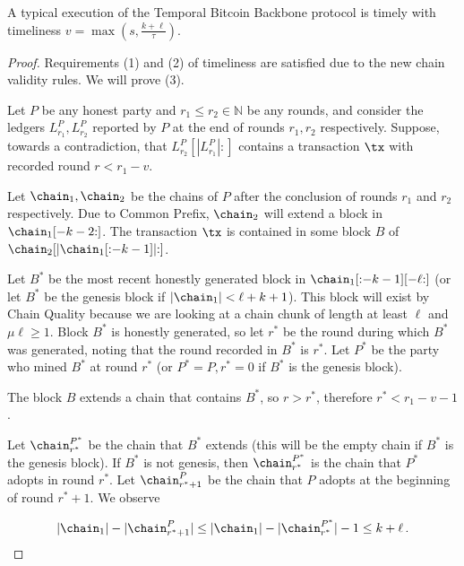 \begin{theorem}
  A typical execution of the Temporal Bitcoin Backbone protocol is timely
  with timeliness $v = \max(s, \frac{k + \ell}{\tau})$.
\end{theorem}
\begin{proof}
  Requirements (1) and (2) of timeliness are satisfied due to the new chain validity rules.
  We will prove (3).

  Let $P$ be any honest party and $r_1 \leq r_2 \in \mathbb{N}$ be any rounds, and consider
  the ledgers $L^P_{r_1}, L^P_{r_2}$ reported by $P$ at the end of rounds $r_1, r_2$ respectively.
  Suppose, towards a contradiction, that $L^P_{r_2}[|L^P_{r_1}|{:}]$ contains a transaction
  $\tx$ with recorded round $r < r_1 - v$.

  Let $\chain_1, \chain_2$ be the chains of $P$ after the conclusion of rounds $r_1$
  and $r_2$ respectively.
  Due to Common Prefix, $\chain_2$ will extend a block in $\chain_1[{-k-2}{:}]$.
  The transaction $\tx$ is contained in some block $B$ of $\chain_2[{|\chain_1[{:}{-k-1}]|}{:}]$.

  Let $B^*$ be the most recent
  honestly generated block in $\chain_1[{:}{-k-1}][-\ell{:}]$
  (or let $B^*$ be the genesis block if $|\chain_1| < \ell + k + 1$).
  This block will exist by
  Chain Quality because we are looking at a chain chunk of length at least $\ell$ and
  $\mu\ell \geq 1$.
  Block $B^*$ is honestly generated, so let $r^*$ be the round
  during which $B^*$ was generated, noting that the round recorded in $B^*$ is $r^*$.
  Let $P^*$ be the party who mined $B^*$ at round $r^*$ (or $P^* = P, r^* = 0$ if $B^*$ is
  the genesis block).

  The block $B$ extends a chain that contains $B^*$, so $r > r^*$,
  therefore $r^* < r_1 - v - 1$.

  Let $\chain^{P^*}_{r^*}$ be the chain that $B^*$ extends (this will be the empty chain if
  $B^*$ is the genesis block). If $B^*$ is not genesis, then $\chain^{P^*}_{r^*}$ is the chain
  that $P^*$ adopts in round $r^*$. Let $\chain^P_{r^* + 1}$ be the chain that $P$ adopts
  at the beginning of round $r^* + 1$. We observe

  \[
     |\chain_1| - |\chain^P_{r^* + 1}| \leq
     |\chain_1| - |\chain^{P^*}_{r^*}| - 1 \leq
     k + \ell\,.
  \]


\end{proof}
